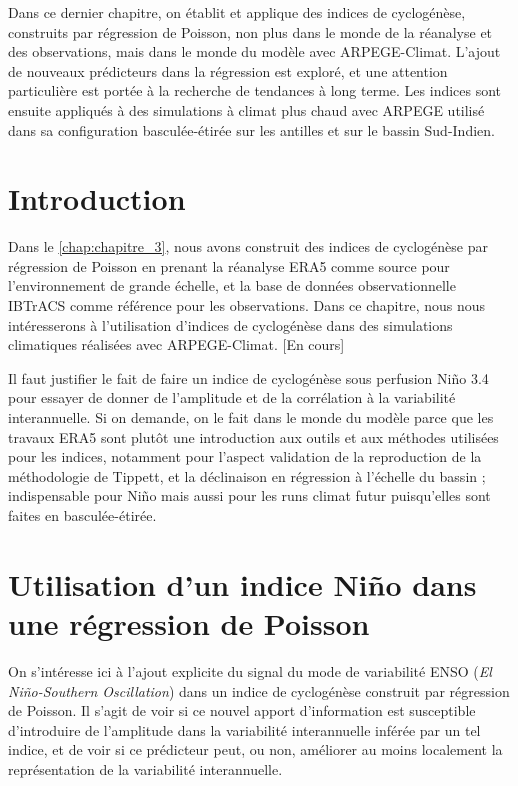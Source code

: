 \documentclass[../main.tex]{subfiles}
\begin{document}
\begin{itshape}
    Dans ce dernier chapitre, on établit et applique des indices de cyclogénèse, construits par régression de Poisson, non plus dans le monde de la réanalyse et
    des observations, mais dans le monde du modèle avec ARPEGE-Climat. L'ajout de nouveaux prédicteurs dans la régression est exploré, et une attention
    particulière est portée à la recherche de tendances à long terme. Les indices sont ensuite appliqués à des simulations à climat plus chaud avec ARPEGE
    utilisé dans sa configuration basculée-étirée sur les antilles et sur le bassin Sud-Indien.
\end{itshape}

\minitoc
\newpage

\section{Introduction}

Dans le \cref{chap:chapitre_3}, nous avons construit des indices de cyclogénèse par régression de Poisson en prenant la réanalyse ERA5 comme source pour
l'environnement de grande échelle, et la base de données observationnelle IBTrACS comme référence pour les observations. Dans ce chapitre, nous nous
intéresserons à l'utilisation d'indices de cyclogénèse dans des simulations climatiques réalisées avec ARPEGE-Climat. [En cours]

Il faut justifier le fait de faire un indice de cyclogénèse sous perfusion Niño 3.4 pour essayer de donner de l'amplitude et de la corrélation à la variabilité
interannuelle. Si on demande, on le fait dans le monde du modèle parce que les travaux ERA5 sont plutôt une introduction aux outils et aux méthodes utilisées
pour les indices, notamment pour l'aspect validation de la reproduction de la méthodologie de Tippett, et la déclinaison en régression à l'échelle du bassin ;
indispensable pour Niño mais aussi pour les runs climat futur puisqu'elles sont faites en basculée-étirée.

\section{Utilisation d'un indice Niño dans une régression de Poisson}\label{sec:indice_ONI}

On s'intéresse ici à l'ajout explicite du signal du mode de variabilité ENSO (\textit{El Niño-Southern Oscillation}) dans un indice de cyclogénèse construit par
régression de Poisson. Il s'agit de voir si ce nouvel apport d'information est susceptible d'introduire de l'amplitude dans la variabilité interannuelle inférée
par un tel indice, et de voir si ce prédicteur peut, ou non, améliorer au moins localement la représentation de la variabilité interannuelle.
\end{document}
